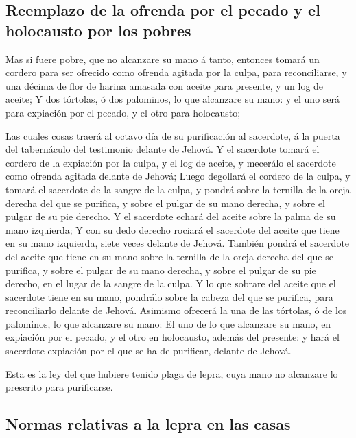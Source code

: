 \hypertarget{reemplazo-de-la-ofrenda-por-el-pecado-y-el-holocausto-por-los-pobres}{%
\subsection{Reemplazo de la ofrenda por el pecado y el holocausto por
los
pobres}\label{reemplazo-de-la-ofrenda-por-el-pecado-y-el-holocausto-por-los-pobres}}

 Mas si fuere pobre, que no alcanzare su mano á tanto,
entonces tomará un cordero para ser ofrecido como ofrenda agitada por la
culpa, para reconciliarse, y una décima de flor de harina amasada con
aceite para presente, y un log de aceite;  Y dos tórtolas,
ó dos palominos, lo que alcanzare su mano: y el uno será para expiación
por el pecado, y el otro para holocausto;

 Las cuales cosas traerá al octavo día de su purificación
al sacerdote, á la puerta del tabernáculo del testimonio delante de
Jehová.  Y el sacerdote tomará el cordero de la expiación
por la culpa, y el log de aceite, y mecerálo el sacerdote como ofrenda
agitada delante de Jehová;  Luego degollará el cordero de
la culpa, y tomará el sacerdote de la sangre de la culpa, y pondrá sobre
la ternilla de la oreja derecha del que se purifica, y sobre el pulgar
de su mano derecha, y sobre el pulgar de su pie derecho.  Y
el sacerdote echará del aceite sobre la palma de su mano izquierda;
 Y con su dedo derecho rociará el sacerdote del aceite que
tiene en su mano izquierda, siete veces delante de Jehová. 
También pondrá el sacerdote del aceite que tiene en su mano sobre la
ternilla de la oreja derecha del que se purifica, y sobre el pulgar de
su mano derecha, y sobre el pulgar de su pie derecho, en el lugar de la
sangre de la culpa.  Y lo que sobrare del aceite que el
sacerdote tiene en su mano, pondrálo sobre la cabeza del que se
purifica, para reconciliarlo delante de Jehová.  Asimismo
ofrecerá la una de las tórtolas, ó de los palominos, lo que alcanzare su
mano:  El uno de lo que alcanzare su mano, en expiación por
el pecado, y el otro en holocausto, además del presente: y hará el
sacerdote expiación por el que se ha de purificar, delante de Jehová.

 Esta es la ley del que hubiere tenido plaga de lepra, cuya
mano no alcanzare lo prescrito para purificarse.

\hypertarget{normas-relativas-a-la-lepra-en-las-casas}{%
\subsection{Normas relativas a la lepra en las
casas}\label{normas-relativas-a-la-lepra-en-las-casas}}

